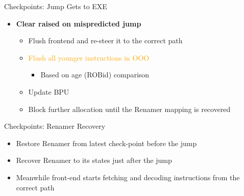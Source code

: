 \documentclass[aspectratio=169,12pt]{beamer}
\begin{document}
\begin{frame}{Checkpoints: Jump Gets to EXE}
    \centering
    
    
    \vspace{0.5cm}
    \begin{itemize}
        \item[] \textbf{Clear raised on mispredicted jump}
        \pause
        \begin{itemize}
            \item Flush frontend and re-steer it to the correct path
            \item \textcolor{orange}{Flush all younger instructions in OOO}
            \begin{itemize}
                \item Based on age (ROBid) comparison
            \end{itemize}
            \item Update BPU
            \item Block further allocation until the Renamer mapping is recovered
        \end{itemize}
    \end{itemize}
\end{frame}

\begin{frame}{Checkpoints: Renamer Recovery}
    \vspace{1cm}
    \centering

    
    \begin{itemize}
        \item Restore Renamer from latest check-point before the jump
        \item Recover Renamer to its states just after the jump
        \item Meanwhile front-end starts fetching and decoding instructions from the correct path
    \end{itemize}
\end{frame}
\end{document}
